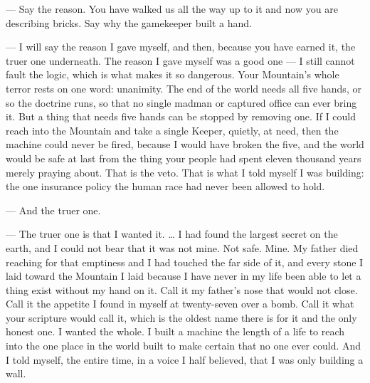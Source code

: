 \begin{room}

--- Say the reason. You have walked us all the way up to it and now you are describing bricks. Say why the gamekeeper built a hand.

--- I will say the reason I gave myself, and then, because you have earned it, the truer one underneath. The reason I gave myself was a good one --- I still cannot fault the logic, which is what makes it so dangerous. Your Mountain's whole terror rests on one word: unanimity. The end of the world needs all five hands, or so the doctrine runs, so that no single madman or captured office can ever bring it. But a thing that needs five hands can be stopped by removing one. If I could reach into the Mountain and take a single Keeper, quietly, at need, then the machine could never be fired, because I would have broken the five, and the world would be safe at last from the thing your people had spent eleven thousand years merely praying about. That is the veto. That is what I told myself I was building: the one insurance policy the human race had never been allowed to hold.

--- And the truer one.

--- The truer one is that I wanted it. \ldots{} I had found the largest secret on the earth, and I could not bear that it was not mine. Not safe. Mine. My father died reaching for that emptiness and I had touched the far side of it, and every stone I laid toward the Mountain I laid because I have never in my life been able to let a thing exist without my hand on it. Call it my father's nose that would not close. Call it the appetite I found in myself at twenty-seven over a bomb. Call it what your scripture would call it, which is the oldest name there is for it and the only honest one. I wanted the whole. I built a machine the length of a life to reach into the one place in the world built to make certain that no one ever could. And I told myself, the entire time, in a voice I half believed, that I was only building a wall.

\end{room}

